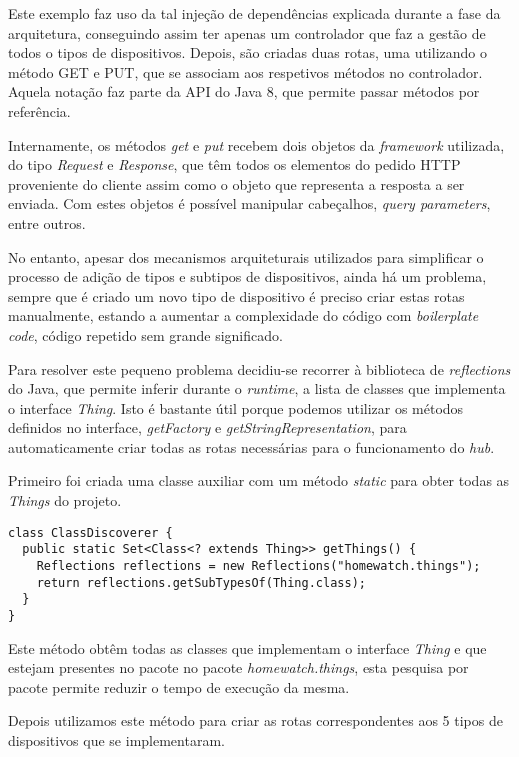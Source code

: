 Este exemplo faz uso da tal injeção de dependências explicada durante a fase da arquitetura, conseguindo assim ter apenas um controlador que faz a gestão de todos o tipos de dispositivos. Depois, são criadas duas rotas, uma utilizando o método GET e PUT, que se associam aos respetivos métodos no controlador. Aquela notação faz parte da API do Java 8, que permite passar métodos por referência.

Internamente, os métodos \textit{get} e \textit{put} recebem dois objetos da \textit{framework} utilizada, do tipo \textit{Request} e \textit{Response}, que têm todos os elementos do pedido HTTP proveniente do cliente assim como o objeto que representa a resposta a ser enviada. Com estes objetos é possível manipular cabeçalhos, \textit{query parameters}, entre outros.

No entanto, apesar dos mecanismos arquiteturais utilizados para simplificar o processo de adição de tipos e subtipos de dispositivos, ainda há um problema, sempre que é criado um novo tipo de dispositivo é preciso criar estas rotas manualmente, estando a aumentar a complexidade do código com \textit{boilerplate code}, código repetido sem grande significado.

Para resolver este pequeno problema decidiu-se recorrer à biblioteca de \textit{reflections} do Java, que permite inferir durante o \textit{runtime}, a lista de classes que implementa o interface \textit{Thing}. Isto é bastante útil porque podemos utilizar os métodos definidos no interface, \textit{getFactory} e \textit{getStringRepresentation}, para automaticamente criar todas as rotas necessárias para o funcionamento do \textit{hub}.

Primeiro foi criada uma classe auxiliar com um método \textit{static} para obter todas as \textit{Things} do projeto.

\begin{verbatim}
class ClassDiscoverer {
  public static Set<Class<? extends Thing>> getThings() {
    Reflections reflections = new Reflections("homewatch.things");
    return reflections.getSubTypesOf(Thing.class);
  }
}
\end{verbatim}

Este método obtêm todas as classes que implementam o interface \textit{Thing} e que estejam presentes no pacote no pacote \textit{homewatch.things}, esta pesquisa por pacote permite reduzir o tempo de execução da mesma.

Depois utilizamos este método para criar as rotas correspondentes aos 5 tipos de dispositivos que se implementaram.


